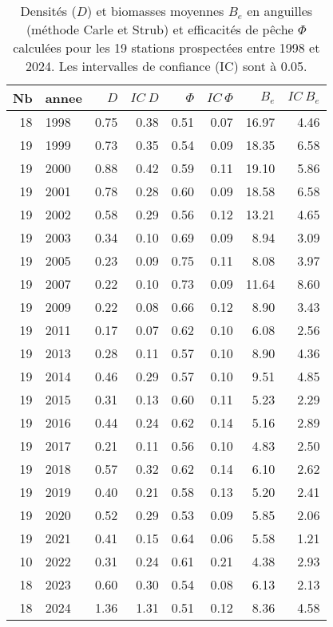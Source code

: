 \begin{table}[htbp]
\centering
\caption[Densités et biomasses.]{Densités ($D$) et biomasses moyennes $B_e$ en anguilles (méthode Carle et Strub) et efficacités de pêche $\Phi$ calculées pour
								les 19 stations prospectées entre 1998 et 2024. Les intervalles de confiance (IC) sont
								à 0.05.} 
\label{tableau2_dens_eff_annee}
\begin{tabular}{rlrrrrrr}
  \hline
Nb & annee & $D$ & $IC~D$ & $\Phi$ & $IC~\Phi$ & $B_e$ & $IC~B_e$ \\ 
  \hline
 18 & 1998 & 0.75 & 0.38 & 0.51 & 0.07 & 16.97 & 4.46 \\ 
   19 & 1999 & 0.73 & 0.35 & 0.54 & 0.09 & 18.35 & 6.58 \\ 
   19 & 2000 & 0.88 & 0.42 & 0.59 & 0.11 & 19.10 & 5.86 \\ 
   19 & 2001 & 0.78 & 0.28 & 0.60 & 0.09 & 18.58 & 6.58 \\ 
   19 & 2002 & 0.58 & 0.29 & 0.56 & 0.12 & 13.21 & 4.65 \\ 
   19 & 2003 & 0.34 & 0.10 & 0.69 & 0.09 & 8.94 & 3.09 \\ 
   19 & 2005 & 0.23 & 0.09 & 0.75 & 0.11 & 8.08 & 3.97 \\ 
   19 & 2007 & 0.22 & 0.10 & 0.73 & 0.09 & 11.64 & 8.60 \\ 
   19 & 2009 & 0.22 & 0.08 & 0.66 & 0.12 & 8.90 & 3.43 \\ 
   19 & 2011 & 0.17 & 0.07 & 0.62 & 0.10 & 6.08 & 2.56 \\ 
   19 & 2013 & 0.28 & 0.11 & 0.57 & 0.10 & 8.90 & 4.36 \\ 
   19 & 2014 & 0.46 & 0.29 & 0.57 & 0.10 & 9.51 & 4.85 \\ 
   19 & 2015 & 0.31 & 0.13 & 0.60 & 0.11 & 5.23 & 2.29 \\ 
   19 & 2016 & 0.44 & 0.24 & 0.62 & 0.14 & 5.16 & 2.89 \\ 
   19 & 2017 & 0.21 & 0.11 & 0.56 & 0.10 & 4.83 & 2.50 \\ 
   19 & 2018 & 0.57 & 0.32 & 0.62 & 0.14 & 6.10 & 2.62 \\ 
   19 & 2019 & 0.40 & 0.21 & 0.58 & 0.13 & 5.20 & 2.41 \\ 
   19 & 2020 & 0.52 & 0.29 & 0.53 & 0.09 & 5.85 & 2.06 \\ 
   19 & 2021 & 0.41 & 0.15 & 0.64 & 0.06 & 5.58 & 1.21 \\ 
   10 & 2022 & 0.31 & 0.24 & 0.61 & 0.21 & 4.38 & 2.93 \\ 
   18 & 2023 & 0.60 & 0.30 & 0.54 & 0.08 & 6.13 & 2.13 \\ 
   18 & 2024 & 1.36 & 1.31 & 0.51 & 0.12 & 8.36 & 4.58 \\ 
   \hline
\end{tabular}
\end{table}
